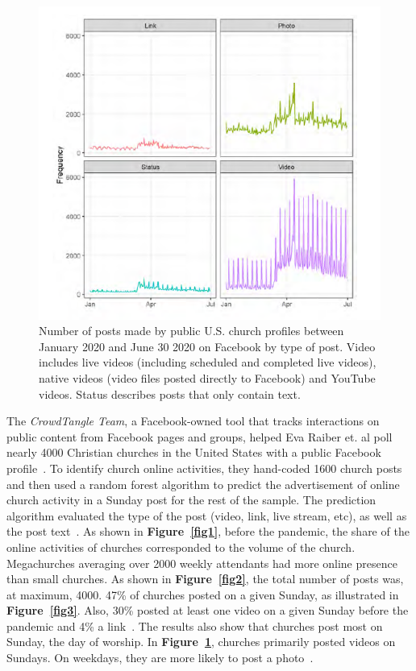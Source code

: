 \begin{figure}[t!]
\centering
\includegraphics[width=\columnwidth]{images/fig_2.PNG}
\caption{Number of posts made by public U.S. church profiles between January 2020 and June 30 2020 on Facebook by type of post. Video includes live videos (including scheduled and completed live videos), native videos (video files posted directly to Facebook) and YouTube videos. Status describes posts that only contain text.}
\label{fig4}
\end{figure}

The \textit{CrowdTangle Team}, a Facebook-owned tool that tracks interactions on public content from Facebook pages and groups, helped Eva Raiber et. al poll nearly 4000 Christian churches in the United States with a public Facebook profile~\cite{Raiber}. To identify church online activities, they hand-coded 1600 church posts and then used a random forest algorithm to predict the advertisement of online church activity in a Sunday post for the rest of the sample. The prediction algorithm evaluated the type of the post (video, link, live stream, etc), as well as the post text~\cite{Raiber}. As shown in \textbf{Figure~\ref{fig1}}, before the pandemic, the share of the online activities of churches corresponded to the volume of the church. Megachurches averaging over 2000 weekly attendants had more online presence than small churches. As shown in \textbf{Figure~\ref{fig2}}, the total number of posts was, at maximum, 4000. 47\% of churches posted on a given Sunday, as illustrated in \textbf{Figure~\ref{fig3}}. Also, 30\% posted at least one video on a given Sunday before the pandemic and 4\% a link~\cite{Raiber}. The results also show that churches post most on Sunday, the day of worship. In \textbf{Figure~\ref{fig4}}, churches primarily posted videos on Sundays. On weekdays, they are more likely to post a photo~\cite{Raiber}.

